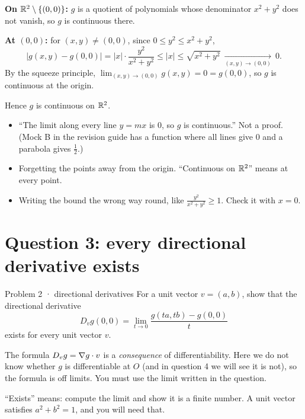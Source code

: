 \begin{answer}
\textbf{On $\mathbb{R}^2\setminus\{(0,0)\}$:} $g$ is a quotient of polynomials whose denominator $x^2+y^2$
does not vanish, so $g$ is continuous there.

\textbf{At $(0,0)$:} for $(x,y)\ne(0,0)$, since $0\le y^2\le x^2+y^2$,
\[
  |g(x,y)-g(0,0)|=|x|\cdot\frac{y^2}{x^2+y^2}\le|x|\le\sqrt{x^2+y^2}\ \xrightarrow[(x,y)\to(0,0)]{}\ 0 .
\]
By the squeeze principle, $\displaystyle\lim_{(x,y)\to(0,0)}g(x,y)=0=g(0,0)$, so $g$ is continuous at
the origin.

Hence $g$ is continuous on $\mathbb{R}^2$.
\end{answer}

\begin{trap}
\begin{itemize}
  \item ``The limit along every line $y=mx$ is $0$, so $g$ is continuous.'' Not a proof. (Mock B in
        the revision guide has a function where all lines give $0$ and a parabola gives $\frac12$.)
  \item Forgetting the points away from the origin. ``Continuous on $\mathbb{R}^2$'' means at every point.
  \item Writing the bound the wrong way round, like $\frac{y^2}{x^2+y^2}\ge1$. Check it with $x=0$.
\end{itemize}
\end{trap}

\section{Question 3: every directional derivative exists}

\begin{question}{Problem 2 \;·\; directional derivatives}
For a unit vector $v=(a,b)$, show that the directional derivative
\[
  D_vg(0,0)=\lim_{t\to0}\frac{g(ta,tb)-g(0,0)}{t}
\]
exists for every unit vector $v$.
\end{question}

\begin{lesson}
The formula $D_vg=\nabla g\cdot v$ is a \emph{consequence} of differentiability. Here we do not know
whether $g$ is differentiable at $O$ (and in question 4 we will see it is not), so the formula is
off limits. You must use the limit written in the question.

``Exists'' means: compute the limit and show it is a finite number. A unit vector satisfies
$a^2+b^2=1$, and you will need that.
\end{lesson}

